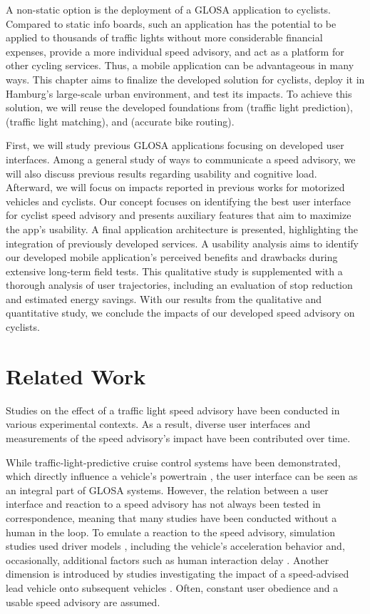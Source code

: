 A non-static option is the deployment of a GLOSA application to cyclists. Compared to static info boards, such an application has the potential to be applied to thousands of traffic lights without more considerable financial expenses, provide a more individual speed advisory, and act as a platform for other cycling services. Thus, a mobile application can be advantageous in many ways. This chapter aims to finalize the developed solution for cyclists, deploy it in Hamburg's large-scale urban environment, and test its impacts. To achieve this solution, we will reuse the developed foundations from  (traffic light prediction),  (traffic light matching), and  (accurate bike routing).

First, we will study previous GLOSA applications focusing on developed user interfaces. Among a general study of ways to communicate a speed advisory, we will also discuss previous results regarding usability and cognitive load. Afterward, we will focus on impacts reported in previous works for motorized vehicles and cyclists. Our concept focuses on identifying the best user interface for cyclist speed advisory and presents auxiliary features that aim to maximize the app's usability. A final application architecture is presented, highlighting the integration of previously developed services. A usability analysis aims to identify our developed mobile application's perceived benefits and drawbacks during extensive long-term field tests. This qualitative study is supplemented with a thorough analysis of user trajectories, including an evaluation of stop reduction and estimated energy savings. With our results from the qualitative and quantitative study, we conclude the impacts of our developed speed advisory on cyclists. 

\section{Related Work}

Studies on the effect of a traffic light speed advisory have been conducted in various experimental contexts. As a result, diverse user interfaces and measurements of the speed advisory's impact have been contributed over time. 

While traffic-light-predictive cruise control systems have been demonstrated, which directly influence a vehicle's powertrain \cite{raubitschek_predictive_2011}, the user interface can be seen as an integral part of GLOSA systems. However, the relation between a user interface and reaction to a speed advisory has not always been tested in correspondence, meaning that many studies have been conducted without a human in the loop. To emulate a reaction to the speed advisory, simulation studies used driver models \cite{hu_lane-level_2023}, including the vehicle's acceleration behavior and, occasionally, additional factors such as human interaction delay \cite{schlamp_2023_glosa}. Another dimension is introduced by studies investigating the impact of a speed-advised lead vehicle onto subsequent vehicles \cite{preuk_does_2016, preuk_should_2018}. Often, constant user obedience and a usable speed advisory are assumed.


